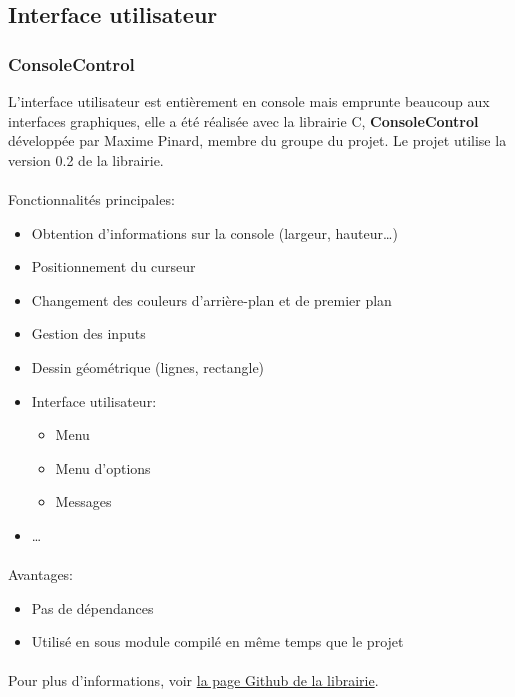 \documentclass[article, backcover, french, nodocumentinfo]{upmethodology-document}
\begin{document}
		\subsection{Interface utilisateur}
			\subsubsection{ConsoleControl}
				L'interface utilisateur est entièrement en console mais emprunte beaucoup aux interfaces graphiques, elle a été réalisée avec la librairie C, \textbf{ConsoleControl} développée par Maxime Pinard, membre du groupe du projet. Le projet utilise la version 0.2 de la librairie.
				\paragraph*{}
					Fonctionnalités principales:
					\begin{itemize}
						\item Obtention d'informations sur la console (largeur, hauteur\ldots)
						\item Positionnement du curseur
						\item Changement des couleurs d'arrière-plan et de premier plan
						\item Gestion des inputs
						\item Dessin géométrique (lignes, rectangle)
						\item Interface utilisateur:
							\begin{itemize}
								\item Menu
								\item Menu d'options
								\item Messages
							\end{itemize}
						\item \ldots
					\end{itemize}
				\paragraph*{}
					Avantages:
					\begin{itemize}
						\item Pas de dépendances
						\item Utilisé en sous module compilé en même temps que le projet
					\end{itemize}
				\paragraph*{}
					Pour plus d'informations, voir \href{https://github.com/pinam45/ConsoleControl}{la page Github de la librairie}.
\end{document}
